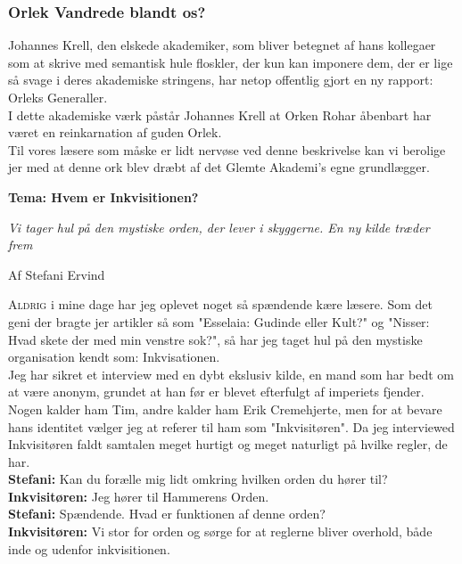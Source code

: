 \documentclass[letterpaper,12pt]{memoir}
\newcommand{\headline}[1]{\textsf{\bfseries\fontsize{34}{36}\selectfont #1}}
\newcommand{\deck}[1]{\textsf{\large\itshape #1}}
\newcommand{\byline}[1]{\textsf{\small\color{Gray} Af #1}}
\begin{document}
\subsubsection*{Orlek Vandrede blandt os?}
Johannes Krell, den elskede akademiker, som bliver betegnet af hans kollegaer som at skrive med semantisk hule floskler, der kun kan imponere dem, der er lige så svage i deres akademiske stringens, har netop offentlig gjort en ny rapport: Orleks Generaller.\\
I dette akademiske værk påstår Johannes Krell at Orken Rohar åbenbart har været en reinkarnation af guden Orlek.\\
Til vores læsere som måske er lidt nervøse ved denne beskrivelse kan vi berolige jer med at denne ork blev dræbt af det Glemte Akademi's egne grundlægger. 

\par\medskip
\headline{Tema: Hvem er Inkvisitionen?}
\par\medskip
\deck{Vi tager hul på den mystiske orden, der lever i skyggerne. En ny kilde træder frem}
\par\medskip
\byline{Stefani Ervind}
\medskip

\lettrine[lines=3,lhang=0.1,loversize=0.05]{A}{ldrig} i mine dage har jeg oplevet noget så spændende kære læsere. Som det geni der bragte jer artikler så som "Esselaia: Gudinde eller Kult?" og "Nisser: Hvad skete der med min venstre sok?", så har jeg taget hul på den mystiske organisation kendt som: Inkvisationen.\\
Jeg har sikret et interview med en dybt ekslusiv kilde, en mand som har bedt om at være anonym, grundet at han før er blevet efterfulgt af imperiets fjender. Nogen kalder ham Tim, andre kalder ham Erik Cremehjerte, men for at bevare hans identitet vælger jeg at referer til ham som "Inkvisitøren".
Da jeg interviewed Inkvisitøren faldt samtalen meget hurtigt og meget naturligt på hvilke regler, de har.\\

\textbf{Stefani:} Kan du forælle mig lidt omkring hvilken orden du hører til?\\
\textbf{Inkvisitøren:} Jeg hører til Hammerens Orden.\\

\textbf{Stefani:} Spændende. Hvad er funktionen af denne orden?\\
\textbf{Inkvisitøren:} Vi stor for orden og sørge for at reglerne bliver overhold, både inde og udenfor inkvisitionen.\\
\end{document}
